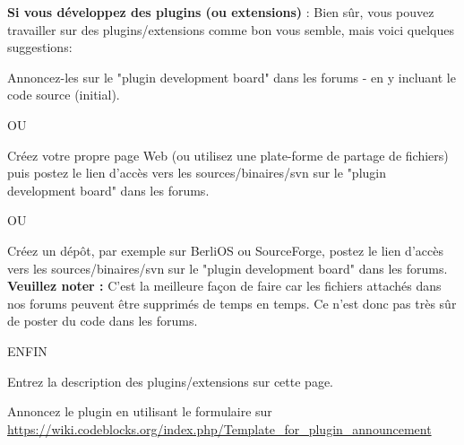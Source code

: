 \textbf{Si vous développez des plugins (ou extensions)} : Bien sûr, vous pouvez travailler sur des plugins/extensions comme bon vous semble, mais voici quelques suggestions:

\tab Annoncez-les sur le "plugin development board" dans les forums - en y incluant le code source (initial).

OU

\tab Créez votre propre page Web (ou utilisez une plate-forme de partage de fichiers) puis postez le lien d'accès vers les sources/binaires/svn sur le "plugin development board" dans les forums.

OU

\tab Créez un dépôt, par exemple sur BerliOS ou SourceForge, postez le lien d'accès vers les sources/binaires/svn sur le "plugin development board" dans les forums. \textbf{Veuillez noter :} C'est la meilleure façon de faire car les fichiers attachés dans nos forums peuvent être supprimés de temps en temps. Ce n'est donc pas très sûr de poster du code dans les forums.

ENFIN

\tab Entrez la description des plugins/extensions sur cette page.

\tab Annoncez le plugin en utilisant le formulaire sur \url{https://wiki.codeblocks.org/index.php/Template_for_plugin_announcement}

\begin{ASTYLE}

\end{ASTYLE}

\begin{AUTOVERSIONING}

\end{AUTOVERSIONING}

\begin{BROWSETRACKS}

\end{BROWSETRACKS}

\begin{CODESNIPPETS}

\end{CODESNIPPETS}

\begin{CODECOMPLETION}

\end{CODECOMPLETION}

\begin{CSCOPE}

\end{CSCOPE}

\begin{DOXYBLOCKS}

\end{DOXYBLOCKS}

